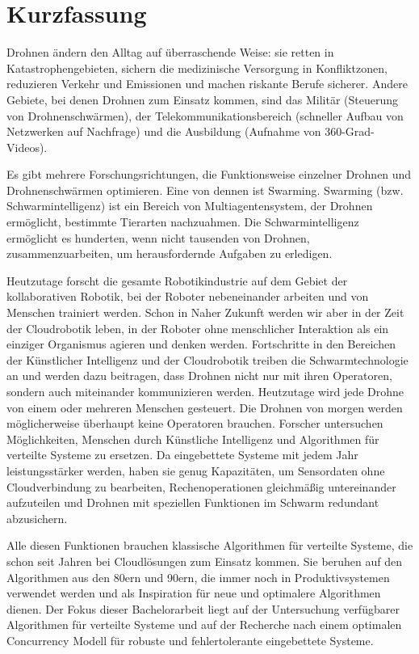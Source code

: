 \chapter{Kurzfassung}


Drohnen ändern den Alltag auf überraschende Weise: sie retten in Katastrophengebieten, sichern die medizinische Versorgung in Konfliktzonen, reduzieren Verkehr und Emissionen und machen riskante Berufe sicherer. Andere Gebiete, bei denen Drohnen zum Einsatz kommen, sind das Militär (Steuerung von Drohnenschwärmen), der Telekommunikationsbereich (schneller Aufbau von Netzwerken auf Nachfrage) und die Ausbildung (Aufnahme von 360-Grad-Videos).

Es gibt mehrere Forschungsrichtungen, die Funktionsweise einzelner Drohnen und Drohnenschwärmen optimieren. Eine von dennen ist Swarming. Swarming (bzw. Schwarmintelligenz) ist ein Bereich von Multiagentensystem, der Drohnen ermöglicht, bestimmte Tierarten nachzuahmen. Die Schwarmintelligenz ermöglicht es hunderten, wenn nicht tausenden von Drohnen, zusammenzuarbeiten, um herausfordernde Aufgaben zu erledigen. 

Heutzutage forscht die gesamte Robotikindustrie auf dem Gebiet der kollaborativen Robotik, bei der Roboter nebeneinander arbeiten und von Menschen trainiert werden. Schon in Naher Zukunft werden wir aber in der Zeit der Cloudrobotik leben, in der Roboter ohne menschlicher Interaktion als ein einziger Organismus agieren und denken werden. Fortschritte in den Bereichen der Künstlicher Intelligenz und der Cloudrobotik treiben die Schwarmtechnologie an und werden dazu beitragen, dass Drohnen nicht nur mit ihren Operatoren, sondern auch miteinander kommunizieren werden. Heutzutage wird jede Drohne von einem oder mehreren Menschen gesteuert. Die Drohnen von morgen werden möglicherweise überhaupt keine Operatoren brauchen. Forscher untersuchen Möglichkeiten, Menschen durch Künstliche Intelligenz und Algorithmen für verteilte Systeme zu ersetzen. Da eingebettete Systeme mit jedem Jahr leistungsstärker werden, haben sie genug Kapazitäten, um Sensordaten ohne Cloudverbindung zu bearbeiten, Rechenoperationen gleichmäßig untereinander aufzuteilen und Drohnen mit speziellen Funktionen im Schwarm redundant abzusichern. 

Alle diesen Funktionen brauchen klassische Algorithmen für verteilte Systeme, die schon seit Jahren bei Cloudlösungen zum Einsatz kommen. Sie beruhen auf den Algorithmen aus den 80ern und 90ern, die immer noch in Produktivsystemen verwendet werden und als Inspiration für neue und optimalere Algorithmen dienen. Der Fokus dieser Bachelorarbeit liegt auf der Untersuchung verfügbarer Algorithmen für verteilte Systeme und auf der Recherche nach einem optimalen Concurrency Modell für robuste und fehlertolerante eingebettete Systeme.
